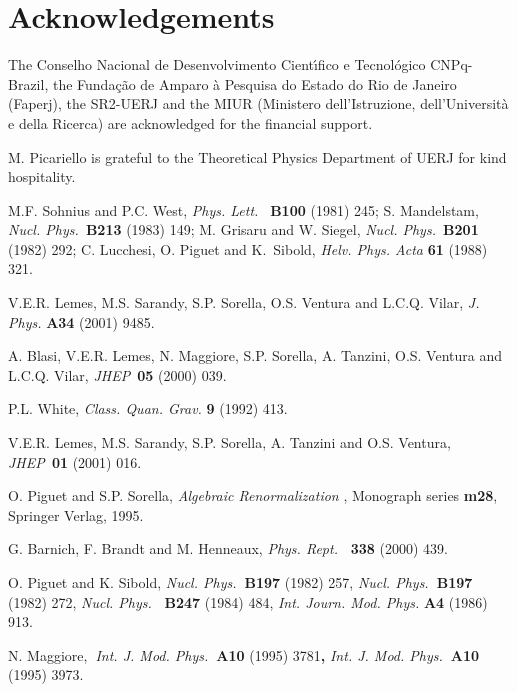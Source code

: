 \documentclass[a4paper,12pt]{article}
\begin{document}
\section*{Acknowledgements}

The Conselho Nacional de Desenvolvimento Cient\'{\i }fico e Tecnol\'{o}gico
CNPq-Brazil, the Funda{\c{c}}{\~{a}}o de Amparo {\`{a}} Pesquisa do Estado
do Rio de Janeiro (Faperj), the SR2-UERJ and the MIUR (Ministero
dell'Istruzione, dell'Universit\`{a} e della Ricerca) are acknowledged for
the financial support. 

M. Picariello is grateful to the Theoretical Physics Department of UERJ for
kind hospitality.

\begin{thebibliography}{99}
  M.F. Sohnius and P.C. West, \emph{Phys. Lett.}\textit{\ }%
\textbf{B100 }(1981) 245;\newline
S. Mandelstam, \emph{Nucl. Phys.}\textit{\ }\textbf{B213} (1983) 149;\newline
M. Grisaru and W. Siegel, \emph{Nucl. Phys.}\textit{\ }\textbf{B201} (1982)
292;\newline
C. Lucchesi, O. Piguet and K.\ Sibold, \emph{Helv. Phys. Acta }\textbf{61 }%
(1988) 321.

  V.E.R. Lemes, M.S. Sarandy, S.P. Sorella, O.S. Ventura and
L.C.Q. Vilar, \emph{J. Phys. }\textbf{A34} (2001) 9485.

  A. Blasi, V.E.R. Lemes, N. Maggiore, S.P. Sorella, A. Tanzini,
O.S. Ventura and L.C.Q. Vilar, \emph{JHEP}\textit{\ }\textbf{05} (2000) 039.

  P.L. White, \emph{Class. Quan. Grav. }\textbf{9 }(1992) 413.

  V.E.R. Lemes, M.S. Sarandy, S.P. Sorella, A. Tanzini and O.S.
Ventura, \emph{JHEP}\textit{\ }\textbf{01} (2001) 016.

  O. Piguet and S.P. Sorella, \emph{Algebraic Renormalization}%
, Monograph series \textbf{m28}, Springer Verlag, 1995.\emph{\ }

  G. Barnich, F. Brandt and M. Henneaux, \emph{Phys. Rept.}%
\textbf{\ 338 }(2000) 439.

  O. Piguet and K. Sibold, \emph{Nucl. Phys.}\textbf{\ B197 }%
(1982) 257, \emph{Nucl. Phys.}\textbf{\ B197 }(1982) 272, \emph{Nucl. Phys.}%
\textbf{\ B247 }(1984) 484, \emph{Int. Journ. Mod. Phys. }\textbf{A4 }(1986)
913.

  N. Maggiore,\textbf{\ }\emph{Int. J. Mod. Phys.}\textbf{\ A10 }%
(1995) 3781\textbf{, }\emph{Int. J. Mod. Phys.}\textbf{\ A10 }(1995) 3973.


\end{thebibliography}
\end{document}
